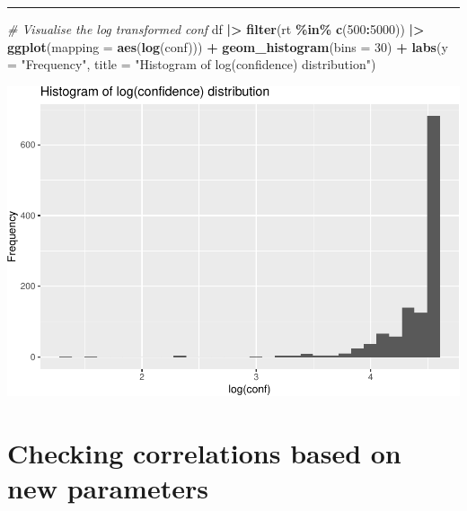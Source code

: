 \documentclass[
]{article}
\newenvironment{Shaded}{\begin{snugshade}}{\end{snugshade}}
\newcommand{\AttributeTok}[1]{\textcolor[rgb]{0.13,0.29,0.53}{#1}}
\newcommand{\CommentTok}[1]{\textcolor[rgb]{0.56,0.35,0.01}{\textit{#1}}}
\newcommand{\DecValTok}[1]{\textcolor[rgb]{0.00,0.00,0.81}{#1}}
\newcommand{\FunctionTok}[1]{\textcolor[rgb]{0.13,0.29,0.53}{\textbf{#1}}}
\newcommand{\NormalTok}[1]{#1}
\newcommand{\SpecialCharTok}[1]{\textcolor[rgb]{0.81,0.36,0.00}{\textbf{#1}}}
\newcommand{\StringTok}[1]{\textcolor[rgb]{0.31,0.60,0.02}{#1}}
\begin{document}
\begin{center}\rule{0.5\linewidth}{0.5pt}\end{center}

\begin{Shaded}
\begin{Highlighting}[]
\CommentTok{\# Visualise the log transformed conf}
\NormalTok{df }\SpecialCharTok{|\textgreater{}}
  \FunctionTok{filter}\NormalTok{(rt }\SpecialCharTok{\%in\%} \FunctionTok{c}\NormalTok{(}\DecValTok{500}\SpecialCharTok{:}\DecValTok{5000}\NormalTok{)) }\SpecialCharTok{|\textgreater{}}
  \FunctionTok{ggplot}\NormalTok{(}\AttributeTok{mapping =} \FunctionTok{aes}\NormalTok{(}\FunctionTok{log}\NormalTok{(conf))) }\SpecialCharTok{+}
  \FunctionTok{geom\_histogram}\NormalTok{(}\AttributeTok{bins =} \DecValTok{30}\NormalTok{) }\SpecialCharTok{+} 
  \FunctionTok{labs}\NormalTok{(}\AttributeTok{y =} \StringTok{"Frequency"}\NormalTok{,}
       \AttributeTok{title =} \StringTok{"Histogram of log(confidence) distribution"}\NormalTok{)}
\end{Highlighting}
\end{Shaded}

\includegraphics{T5_Data_wrangling_pdf_files/figure-latex/unnamed-chunk-13-1.pdf}

\hypertarget{checking-correlations-based-on-new-parameters}{%
\section{Checking correlations based on new
parameters}\label{checking-correlations-based-on-new-parameters}}
\end{document}
